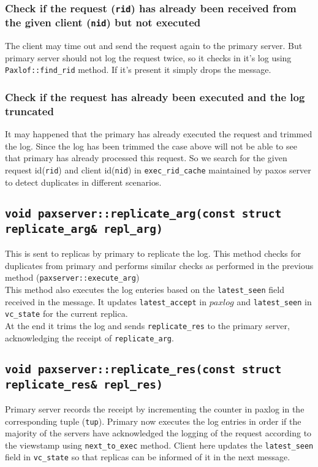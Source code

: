 \documentclass[10pt] {article}
\begin{document}
\subsubsection {Check if the request (\texttt{rid}) has already been received from the given client (\texttt{nid}) but not executed}
The client may time out and send the request again to the primary server. But primary server should not log the request twice, so it checks in it's log using \texttt{Paxlof::find\_rid} method. If it's present it simply drops the message.
\subsubsection {Check if the request has already been executed and the log truncated}
It may happened that the primary has already executed the request and trimmed the log. Since the log has been trimmed the case above will not be able to see that primary has already processed this request. So we search for the given request id(\texttt{rid}) and client id(\texttt{nid}) in \texttt{exec\_rid\_cache} maintained by paxos server to detect duplicates in different scenarios.

\subsection {\texttt{void paxserver::replicate\_arg(const struct replicate\_arg\& repl\_arg)}}
This is sent to replicas by primary to replicate the log. This method checks for duplicates from primary and performs similar checks as performed in the previous method (\texttt{paxserver::execute\_arg}) \\

This method also executes the log enteries based on the \texttt{latest\_seen} field received in the message. It updates \texttt{latest\_accept} in $paxlog$ and \texttt{latest\_seen} in \texttt{vc\_state} for the current replica. \\

At the end it trims the log and sends \texttt{replicate\_res} to the primary server, acknowledging the receipt of \texttt{replicate\_arg}. \\

\subsection {\texttt{void paxserver::replicate\_res(const struct replicate\_res\& repl\_res) }}
Primary server records the receipt by incrementing the counter in paxlog in the corresponding tuple (\texttt{tup}). Primary now executes the log entries in order if the majority of the servers have acknowledged the logging of the request according to the viewstamp using \texttt{next\_to\_exec} method. Client here updates the \texttt{latest\_seen} field in \texttt{vc\_state} so that replicas can be informed of it in the next message. \\
\end{document}
